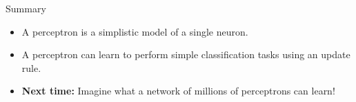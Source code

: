 \documentclass[9pt]{beamer}
\begin{document}
\begin{frame}{Summary}

\begin{itemize}
	\item A perceptron is a simplistic model of a single neuron.
	\item A perceptron can learn to perform simple classification tasks using an update rule.
	\item<2-> \textbf{Next time:} Imagine what a network of millions of perceptrons can learn!
\end{itemize}
	
\end{frame}
\end{document}
